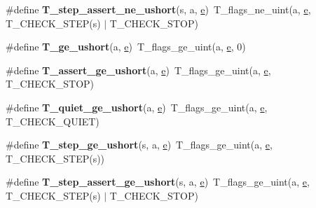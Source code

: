 \begin{DoxyCompactItemize}
\#define {\bfseries T\+\_\+step\+\_\+assert\+\_\+ne\+\_\+ushort}(s,  a,  \mbox{\hyperlink{sun4u_2tte_8h_a8b0b9ed08e0e18920ec2682f48228c27}{e}})~T\+\_\+flags\+\_\+ne\+\_\+uint(a, \mbox{\hyperlink{sun4u_2tte_8h_a8b0b9ed08e0e18920ec2682f48228c27}{e}}, T\+\_\+\+C\+H\+E\+C\+K\+\_\+\+S\+T\+EP(s) $\vert$ T\+\_\+\+C\+H\+E\+C\+K\+\_\+\+S\+T\+OP)
\item 
\mbox{\label{group__RTEMSTestFrameworkChecksUShort_gadbdbdde2d3acf299fd148b96fd4f0a98}} 
\#define {\bfseries T\+\_\+ge\+\_\+ushort}(a,  \mbox{\hyperlink{sun4u_2tte_8h_a8b0b9ed08e0e18920ec2682f48228c27}{e}})~T\+\_\+flags\+\_\+ge\+\_\+uint(a, \mbox{\hyperlink{sun4u_2tte_8h_a8b0b9ed08e0e18920ec2682f48228c27}{e}}, 0)
\item 
\mbox{\label{group__RTEMSTestFrameworkChecksUShort_ga9e63662efa14370972930dd1fa13a72c}} 
\#define {\bfseries T\+\_\+assert\+\_\+ge\+\_\+ushort}(a,  \mbox{\hyperlink{sun4u_2tte_8h_a8b0b9ed08e0e18920ec2682f48228c27}{e}})~T\+\_\+flags\+\_\+ge\+\_\+uint(a, \mbox{\hyperlink{sun4u_2tte_8h_a8b0b9ed08e0e18920ec2682f48228c27}{e}}, T\+\_\+\+C\+H\+E\+C\+K\+\_\+\+S\+T\+OP)
\item 
\mbox{\label{group__RTEMSTestFrameworkChecksUShort_ga6b47fecf13327b71e72f2fc606323f95}} 
\#define {\bfseries T\+\_\+quiet\+\_\+ge\+\_\+ushort}(a,  \mbox{\hyperlink{sun4u_2tte_8h_a8b0b9ed08e0e18920ec2682f48228c27}{e}})~T\+\_\+flags\+\_\+ge\+\_\+uint(a, \mbox{\hyperlink{sun4u_2tte_8h_a8b0b9ed08e0e18920ec2682f48228c27}{e}}, T\+\_\+\+C\+H\+E\+C\+K\+\_\+\+Q\+U\+I\+ET)
\item 
\mbox{\label{group__RTEMSTestFrameworkChecksUShort_ga3ab76e5143e1bc2de0b5fdf6cee1c4bf}} 
\#define {\bfseries T\+\_\+step\+\_\+ge\+\_\+ushort}(s,  a,  \mbox{\hyperlink{sun4u_2tte_8h_a8b0b9ed08e0e18920ec2682f48228c27}{e}})~T\+\_\+flags\+\_\+ge\+\_\+uint(a, \mbox{\hyperlink{sun4u_2tte_8h_a8b0b9ed08e0e18920ec2682f48228c27}{e}}, T\+\_\+\+C\+H\+E\+C\+K\+\_\+\+S\+T\+EP(s))
\item 
\mbox{\label{group__RTEMSTestFrameworkChecksUShort_gac536fe2799739eaa0e5bea24ebe986a5}} 
\#define {\bfseries T\+\_\+step\+\_\+assert\+\_\+ge\+\_\+ushort}(s,  a,  \mbox{\hyperlink{sun4u_2tte_8h_a8b0b9ed08e0e18920ec2682f48228c27}{e}})~T\+\_\+flags\+\_\+ge\+\_\+uint(a, \mbox{\hyperlink{sun4u_2tte_8h_a8b0b9ed08e0e18920ec2682f48228c27}{e}}, T\+\_\+\+C\+H\+E\+C\+K\+\_\+\+S\+T\+EP(s) $\vert$ T\+\_\+\+C\+H\+E\+C\+K\+\_\+\+S\+T\+OP)

\end{DoxyCompactItemize}
